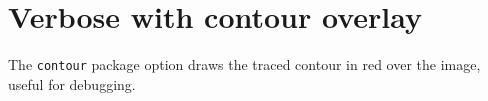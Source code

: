 \documentclass{article}
\begin{document}
\section*{Verbose with contour overlay}

The \texttt{contour} package option draws the traced contour
in red over the image, useful for debugging.

\lipsum[1-8]
\end{document}
